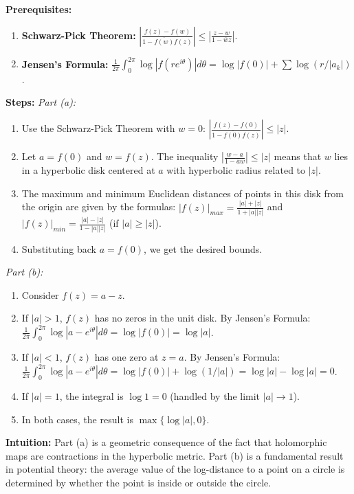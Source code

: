 \begin{solution}
\textbf{Prerequisites:}
\begin{enumerate}
    \item \textbf{Schwarz-Pick Theorem:} $|\frac{f(z)-f(w)}{1-\overline{f(w)}f(z)}| \leq |\frac{z-w}{1-\bar{w}z}|$.
    \item \textbf{Jensen's Formula:} $\frac{1}{2\pi} \int_0^{2\pi} \log|f(re^{i\theta})| d\theta = \log|f(0)| + \sum \log(r/|a_k|)$.
\end{enumerate}

\textbf{Steps:}
\textit{Part (a):}
\begin{enumerate}
    \item Use the Schwarz-Pick Theorem with $w=0$:
       $\left| \frac{f(z) - f(0)}{1 - \overline{f(0)}f(z)} \right| \leq |z|$.
    \item Let $a = f(0)$ and $w = f(z)$. The inequality $| \frac{w-a}{1-\bar{a}w} | \leq |z|$ means that $w$ lies in a hyperbolic disk centered at $a$ with hyperbolic radius related to $|z|$.
    \item The maximum and minimum Euclidean distances of points in this disk from the origin are given by the formulas:
       $|f(z)|_{max} = \frac{|a| + |z|}{1 + |a||z|}$ and $|f(z)|_{min} = \frac{|a| - |z|}{1 - |a||z|}$ (if $|a| \geq |z|$).
    \item Substituting back $a = f(0)$, we get the desired bounds.
\end{enumerate}

\textit{Part (b):}
\begin{enumerate}
    \item Consider $f(z) = a - z$.
    \item If $|a| > 1$, $f(z)$ has no zeros in the unit disk. By Jensen's Formula:
       $\frac{1}{2\pi} \int_0^{2\pi} \log|a - e^{i\theta}| d\theta = \log|f(0)| = \log|a|$.
    \item If $|a| < 1$, $f(z)$ has one zero at $z=a$. By Jensen's Formula:
       $\frac{1}{2\pi} \int_0^{2\pi} \log|a - e^{i\theta}| d\theta = \log|f(0)| + \log(1/|a|) = \log|a| - \log|a| = 0$.
    \item If $|a| = 1$, the integral is $\log 1 = 0$ (handled by the limit $|a| \to 1$).
    \item In both cases, the result is $\max\{\log|a|, 0\}$.
\end{enumerate}

\textbf{Intuition:}
Part (a) is a geometric consequence of the fact that holomorphic maps are contractions in the hyperbolic metric.
Part (b) is a fundamental result in potential theory: the average value of the log-distance to a point on a circle is determined by whether the point is inside or outside the circle.
\end{solution}


